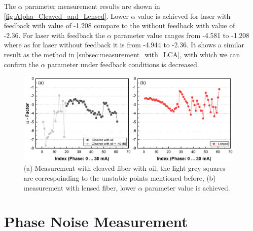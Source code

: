 The $\alpha$ parameter measurement results are shown in \autoref{fig:Alpha_Cleaved_and_Lensed}. Lower $\alpha$ value is achieved for laser with feedback with value of -1.208 compare to the without feedback with value of -2.36. For laser with feedback the $\alpha$ parameter value ranges from -4.581 to -1.208 where as for laser without feedback it is from -4.944 to -2.36. It shows a similar result as the method in \autoref{subsec:measurement_with_LCA}, with which we can confirm the $\alpha$ parameter under feedback conditions is decreased.
\begin{figure}[ht]
    \centering
    \includegraphics[width=\linewidth]{figures/Alpha_Cleaved_and_Lensed.png}
    \caption{(a) Measurement with cleaved fiber with oil, the light grey squares are correspoinding to the unstable points mentioned before, (b) measurement with lensed fiber, lower $\alpha$ parameter value is achieved.}
    \label{fig:Alpha_Cleaved_and_Lensed}
\end{figure}

\section{Phase Noise Measurement}

